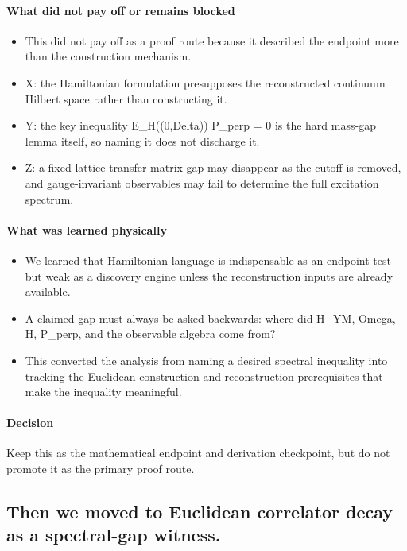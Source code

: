 \documentclass[11pt]{article}
\begin{document}
\paragraph{What did not pay off or remains blocked}

\begin{itemize}
\item This did not pay off as a proof route because it described the endpoint more than the construction mechanism.
\item X: the Hamiltonian formulation presupposes the reconstructed continuum Hilbert space rather than constructing it.
\item Y: the key inequality E\_H((0,Delta)) P\_perp = 0 is the hard mass-gap lemma itself, so naming it does not discharge it.
\item Z: a fixed-lattice transfer-matrix gap may disappear as the cutoff is removed, and gauge-invariant observables may fail to determine the full excitation spectrum.
\end{itemize}

\paragraph{What was learned physically}

\begin{itemize}
\item We learned that Hamiltonian language is indispensable as an endpoint test but weak as a discovery engine unless the reconstruction inputs are already available.
\item A claimed gap must always be asked backwards: where did H\_YM, Omega, H, P\_perp, and the observable algebra come from?
\item This converted the analysis from naming a desired spectral inequality into tracking the Euclidean construction and reconstruction prerequisites that make the inequality meaningful.
\end{itemize}

\paragraph{Decision}

Keep this as the mathematical endpoint and derivation checkpoint, but do not promote it as the primary proof route.

\subsection*{Then we moved to Euclidean correlator decay as a spectral-gap witness.}
\end{document}
